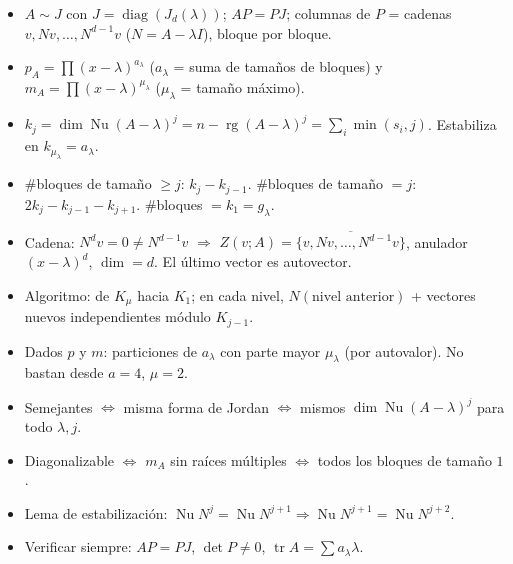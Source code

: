 \documentclass{article}
\DeclareMathOperator{\rg}{rg}
\DeclareMathOperator{\tr}{tr}
\newcommand{\gen}[1]{\overline{\{#1\}}}          %
\DeclareMathOperator{\Nu}{Nu}
\theoremstyle{plain}
\theoremstyle{definition}
\theoremstyle{remark}
\begin{document}
\begin{itemize}
    \item \(A\sim J\) con \(J=\operatorname{diag}(J_d(\lambda))\); \(AP=PJ\); columnas de \(P\) = cadenas \(v,Nv,\dots,N^{d-1}v\) (\(N=A-\lambda I\)), bloque por bloque.
    \item \(p_A=\prod(x-\lambda)^{a_\lambda}\) (\(a_\lambda\) = suma de tamaños de bloques) y \(m_A=\prod(x-\lambda)^{\mu_\lambda}\) (\(\mu_\lambda\) = tamaño máximo).
    \item \(k_j=\dim\Nu(A-\lambda)^j=n-\rg(A-\lambda)^j=\sum_i\min(s_i,j)\). Estabiliza en \(k_{\mu_\lambda}=a_\lambda\).
    \item \#bloques de tamaño \(\ge j\): \(k_j-k_{j-1}\). \#bloques de tamaño \(=j\): \(2k_j-k_{j-1}-k_{j+1}\). \#bloques \(=k_1=g_\lambda\).
    \item Cadena: \(N^dv=0\ne N^{d-1}v\) \(\Rightarrow\) \(Z(v;A)=\gen{v,Nv,\dots,N^{d-1}v}\), anulador \((x-\lambda)^d\), \(\dim=d\). El último vector es autovector.
    \item Algoritmo: de \(K_\mu\) hacia \(K_1\); en cada nivel, \(N(\text{nivel anterior})\) + vectores nuevos independientes módulo \(K_{j-1}\).
    \item Dados \(p\) y \(m\): particiones de \(a_\lambda\) con parte mayor \(\mu_\lambda\) (por autovalor). No bastan desde \(a=4\), \(\mu=2\).
    \item Semejantes \(\iff\) misma forma de Jordan \(\iff\) mismos \(\dim\Nu(A-\lambda)^j\) para todo \(\lambda,j\).
    \item Diagonalizable \(\iff\) \(m_A\) sin raíces múltiples \(\iff\) todos los bloques de tamaño \(1\).
    \item Lema de estabilización: \(\Nu N^j=\Nu N^{j+1}\Rightarrow\Nu N^{j+1}=\Nu N^{j+2}\).
    \item Verificar siempre: \(AP=PJ\), \(\det P\ne0\), \(\tr A=\sum a_\lambda\lambda\).
\end{itemize}
\end{document}
